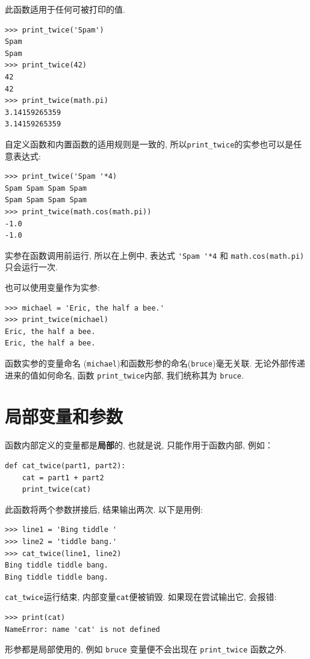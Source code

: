 \documentclass[10pt]{book}
\begin{document}
此函数适用于任何可被打印的值. 

\begin{verbatim}
>>> print_twice('Spam')
Spam
Spam
>>> print_twice(42)
42
42
>>> print_twice(math.pi)
3.14159265359
3.14159265359
\end{verbatim}
%
自定义函数和内置函数的适用规则是一致的, 
所以\verb"print_twice"的实参也可以是任意表达式:

\begin{verbatim}
>>> print_twice('Spam '*4)
Spam Spam Spam Spam
Spam Spam Spam Spam
>>> print_twice(math.cos(math.pi))
-1.0
-1.0
\end{verbatim}
%
实参在函数调用前运行, 所以在上例中, 表达式 \verb"'Spam '*4" 和
{\tt math.cos(math.pi)} 只会运行一次. 

也可以使用变量作为实参:

\begin{verbatim}
>>> michael = 'Eric, the half a bee.'
>>> print_twice(michael)
Eric, the half a bee.
Eric, the half a bee.
\end{verbatim}
%
函数实参的变量命名 ({\tt michael})和函数形参的命名({\tt bruce})毫无关联. 
无论外部传递进来的值如何命名, 函数 \verb"print_twice"内部, 我们统称其为 {\tt bruce}. 


\section{局部变量和参数}

函数内部定义的变量都是{\bf 局部}的, 也就是说, 只能作用于函数内部, 例如：

\begin{verbatim}
def cat_twice(part1, part2):
    cat = part1 + part2
    print_twice(cat)
\end{verbatim}
%
此函数将两个参数拼接后, 结果输出两次. 以下是用例:

\begin{verbatim}
>>> line1 = 'Bing tiddle '
>>> line2 = 'tiddle bang.'
>>> cat_twice(line1, line2)
Bing tiddle tiddle bang.
Bing tiddle tiddle bang.
\end{verbatim}
%
\verb"cat_twice"运行结束, 内部变量{\tt cat}便被销毁. 
如果现在尝试输出它, 会报错:

\begin{verbatim}
>>> print(cat)
NameError: name 'cat' is not defined
\end{verbatim}
%
形参都是局部使用的, 例如 {\tt bruce} 变量便不会出现在 \verb"print_twice" 函数之外.
\end{document}
